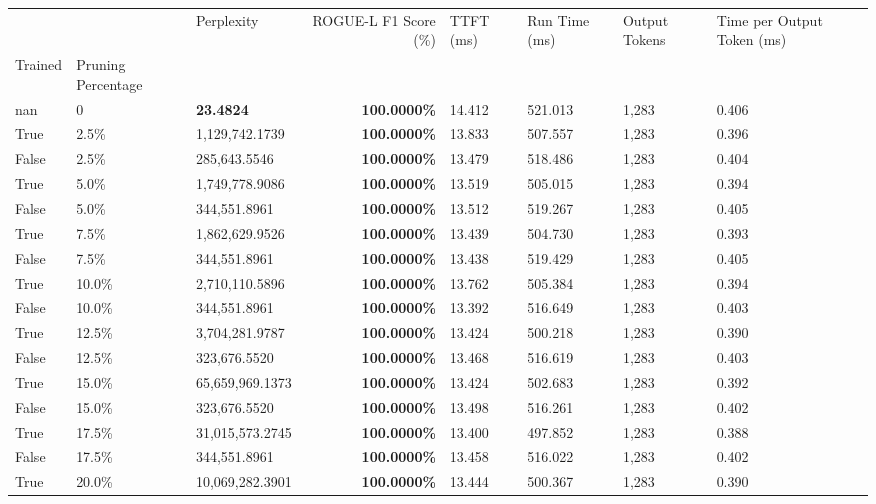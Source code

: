 \begin{table}[H]
\begin{tabular}{lllrllll}
\toprule
 &  & Perplexity & ROGUE-L F1 Score (\%) & TTFT (ms) & Run Time (ms) & Output Tokens & Time per Output Token (ms) \\
Trained & Pruning Percentage &  &  &  &  &  &  \\
\midrule
nan & 0 & \bfseries 23.4824 & \bfseries 100.0000\% & 14.412 & 521.013 & 1,283 & 0.406 \\
\cline{1-8}
True & 2.5\% & 1,129,742.1739 & \bfseries \color{red} 100.0000\% & 13.833 & 507.557 & 1,283 & 0.396 \\
\cline{1-8}
False & 2.5\% & \color{red} 285,643.5546 & \bfseries \color{red} 100.0000\% & 13.479 & 518.486 & 1,283 & 0.404 \\
\cline{1-8}
True & 5.0\% & 1,749,778.9086 & \bfseries \color{red} 100.0000\% & 13.519 & 505.015 & 1,283 & 0.394 \\
\cline{1-8}
False & 5.0\% & 344,551.8961 & \bfseries \color{red} 100.0000\% & 13.512 & 519.267 & 1,283 & 0.405 \\
\cline{1-8}
True & 7.5\% & 1,862,629.9526 & \bfseries \color{red} 100.0000\% & 13.439 & 504.730 & 1,283 & 0.393 \\
\cline{1-8}
False & 7.5\% & 344,551.8961 & \bfseries \color{red} 100.0000\% & 13.438 & 519.429 & 1,283 & 0.405 \\
\cline{1-8}
True & 10.0\% & 2,710,110.5896 & \bfseries \color{red} 100.0000\% & 13.762 & 505.384 & 1,283 & 0.394 \\
\cline{1-8}
False & 10.0\% & 344,551.8961 & \bfseries \color{red} 100.0000\% & 13.392 & 516.649 & 1,283 & 0.403 \\
\cline{1-8}
True & 12.5\% & 3,704,281.9787 & \bfseries \color{red} 100.0000\% & 13.424 & 500.218 & 1,283 & 0.390 \\
\cline{1-8}
False & 12.5\% & 323,676.5520 & \bfseries \color{red} 100.0000\% & 13.468 & 516.619 & 1,283 & 0.403 \\
\cline{1-8}
True & 15.0\% & 65,659,969.1373 & \bfseries \color{red} 100.0000\% & 13.424 & 502.683 & 1,283 & 0.392 \\
\cline{1-8}
False & 15.0\% & 323,676.5520 & \bfseries \color{red} 100.0000\% & 13.498 & 516.261 & 1,283 & 0.402 \\
\cline{1-8}
True & 17.5\% & 31,015,573.2745 & \bfseries \color{red} 100.0000\% & 13.400 & 497.852 & 1,283 & 0.388 \\
\cline{1-8}
False & 17.5\% & 344,551.8961 & \bfseries \color{red} 100.0000\% & 13.458 & 516.022 & 1,283 & 0.402 \\
\cline{1-8}
True & 20.0\% & 10,069,282.3901 & \bfseries \color{red} 100.0000\% & 13.444 & 500.367 & 1,283 & 0.390 \\

\end{tabular}
\end{table}
